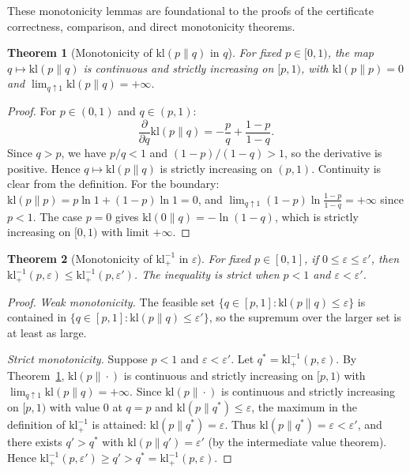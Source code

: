 \documentclass[11pt,a4paper]{article}
\newtheorem{theorem}{Theorem}
\newcommand{\kl}{\mathrm{kl}}
\newcommand{\klinv}{\kl^{-1}_+}
\begin{document}
These monotonicity lemmas are foundational to the proofs of the certificate correctness, comparison, and direct monotonicity theorems.

\begin{theorem}[Monotonicity of $\kl(p\|q)$ in $q$]
\label{thm:mono-q}
For fixed $p \in [0,1)$, the map $q \mapsto \kl(p\|q)$ is continuous and strictly increasing on $[p,1)$, with $\kl(p\|p) = 0$ and $\lim_{q \uparrow 1} \kl(p\|q) = +\infty$.
\end{theorem}

\begin{proof}
For $p \in (0,1)$ and $q \in (p,1)$:
\[
\frac{\partial}{\partial q} \kl(p\|q) = -\frac{p}{q} + \frac{1-p}{1-q}.
\]
Since $q > p$, we have $p/q < 1$ and $(1-p)/(1-q) > 1$, so the derivative is positive. Hence $q \mapsto \kl(p\|q)$ is strictly increasing on $(p,1)$. Continuity is clear from the definition. For the boundary: $\kl(p\|p) = p \ln 1 + (1-p) \ln 1 = 0$, and $\lim_{q \uparrow 1} (1-p)\ln\frac{1-p}{1-q} = +\infty$ since $p < 1$. The case $p = 0$ gives $\kl(0\|q) = -\ln(1-q)$, which is strictly increasing on $[0,1)$ with limit $+\infty$.
\end{proof}

\begin{theorem}[Monotonicity of $\klinv$ in $\varepsilon$]
\label{thm:mono-eps}
For fixed $p \in [0,1]$, if $0 \le \varepsilon \le \varepsilon'$, then $\klinv(p,\varepsilon) \le \klinv(p,\varepsilon')$. The inequality is strict when $p < 1$ and $\varepsilon < \varepsilon'$.
\end{theorem}

\begin{proof}
\emph{Weak monotonicity.} The feasible set $\{q \in [p,1] : \kl(p\|q) \le \varepsilon\}$ is contained in $\{q \in [p,1] : \kl(p\|q) \le \varepsilon'\}$, so the supremum over the larger set is at least as large.

\emph{Strict monotonicity.} Suppose $p < 1$ and $\varepsilon < \varepsilon'$. Let $q^* = \klinv(p,\varepsilon)$. By Theorem~\ref{thm:mono-q}, $\kl(p\|\cdot)$ is continuous and strictly increasing on $[p,1)$ with $\lim_{q \uparrow 1} \kl(p\|q) = +\infty$. Since $\kl(p\|\cdot)$ is continuous and strictly increasing on $[p,1)$ with value $0$ at $q = p$ and $\kl(p\|q^*) \le \varepsilon$, the maximum in the definition of $\klinv$ is attained: $\kl(p\|q^*) = \varepsilon$. Thus $\kl(p\|q^*) = \varepsilon < \varepsilon'$, and there exists $q' > q^*$ with $\kl(p\|q') = \varepsilon'$ (by the intermediate value theorem). Hence $\klinv(p,\varepsilon') \ge q' > q^* = \klinv(p,\varepsilon)$.
\end{proof}
\end{document}
